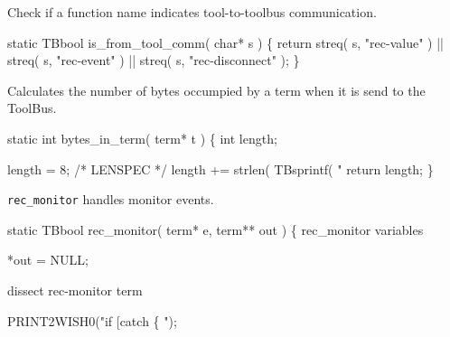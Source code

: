 
Check if a function name indicates tool-to-toolbus communication.

\nwenddocs{}\endmoddef\let\nwnotused=\nwoutput{}\nwstartdeflinemarkup{}\nwenddeflinemarkup
static TBbool is_from_tool_comm( char* s )
\{
   return streq( s, "rec-value" ) ||  
          streq( s, "rec-event" ) ||
          streq( s, "rec-disconnect" );
\}
\nwendcode{}\nwdocspar


Calculates the number of bytes occumpied by a term when it is send
to the ToolBus.

\nwenddocs{}\endmoddef\let\nwnotused=\nwoutput{}\nwstartdeflinemarkup{}\nwenddeflinemarkup
static int bytes_in_term( term* t )
\{ 
   int length;
   
   length = 8; /* LENSPEC */
   length += strlen( TBsprintf( "%
   return length;
\}
\nwendcode{}\nwdocspar


{\tt rec\_monitor} handles monitor events.

\nwenddocs{}\endmoddef\let\nwnotused=\nwoutput{}\nwstartdeflinemarkup{}\nwenddeflinemarkup
static TBbool rec_monitor( term* e, term** out )
\{
  \LA{}rec_monitor variables~{\nwtagstyle{}}\RA{}

  *out = NULL;

  \LA{}dissect rec-monitor term~{\nwtagstyle{}}\RA{}

  PRINT2WISH0("if [catch \{ ");

